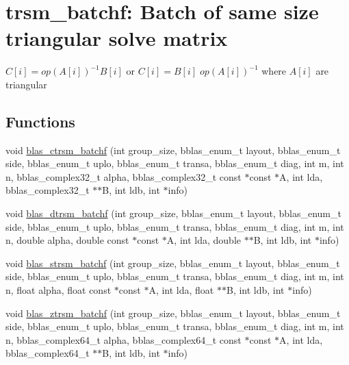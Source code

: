 \hypertarget{group__trsm__batchf}{}\section{trsm\+\_\+batchf\+: Batch of same size triangular solve matrix}
\label{group__trsm__batchf}


$ C[i] = op(A[i])^{-1} B[i] $ or $ C[i] = B[i] \;op(A[i])^{-1} $ where $ A[i] $ are triangular  


\subsection*{Functions}
\begin{DoxyCompactItemize}
\item 
void \hyperlink{group__trsm__batchf_ga8d26eef5fac78c6c866b81bfd73ec443}{blas\+\_\+ctrsm\+\_\+batchf} (int group\+\_\+size, bblas\+\_\+enum\+\_\+t layout, bblas\+\_\+enum\+\_\+t side, bblas\+\_\+enum\+\_\+t uplo, bblas\+\_\+enum\+\_\+t transa, bblas\+\_\+enum\+\_\+t diag, int m, int n, bblas\+\_\+complex32\+\_\+t alpha, bblas\+\_\+complex32\+\_\+t const $\ast$const $\ast$A, int lda, bblas\+\_\+complex32\+\_\+t $\ast$$\ast$B, int ldb, int $\ast$info)
\item 
void \hyperlink{group__trsm__batchf_gaaf04f4a1d924157736c9712a82b556bb}{blas\+\_\+dtrsm\+\_\+batchf} (int group\+\_\+size, bblas\+\_\+enum\+\_\+t layout, bblas\+\_\+enum\+\_\+t side, bblas\+\_\+enum\+\_\+t uplo, bblas\+\_\+enum\+\_\+t transa, bblas\+\_\+enum\+\_\+t diag, int m, int n, double alpha, double const $\ast$const $\ast$A, int lda, double $\ast$$\ast$B, int ldb, int $\ast$info)
\item 
void \hyperlink{group__trsm__batchf_ga3a305094ed72cc68fa60e4a749f56e1f}{blas\+\_\+strsm\+\_\+batchf} (int group\+\_\+size, bblas\+\_\+enum\+\_\+t layout, bblas\+\_\+enum\+\_\+t side, bblas\+\_\+enum\+\_\+t uplo, bblas\+\_\+enum\+\_\+t transa, bblas\+\_\+enum\+\_\+t diag, int m, int n, float alpha, float const $\ast$const $\ast$A, int lda, float $\ast$$\ast$B, int ldb, int $\ast$info)
\item 
void \hyperlink{group__trsm__batchf_ga262ec8615f2eaa0ab09966b69aba9a17}{blas\+\_\+ztrsm\+\_\+batchf} (int group\+\_\+size, bblas\+\_\+enum\+\_\+t layout, bblas\+\_\+enum\+\_\+t side, bblas\+\_\+enum\+\_\+t uplo, bblas\+\_\+enum\+\_\+t transa, bblas\+\_\+enum\+\_\+t diag, int m, int n, bblas\+\_\+complex64\+\_\+t alpha, bblas\+\_\+complex64\+\_\+t const $\ast$const $\ast$A, int lda, bblas\+\_\+complex64\+\_\+t $\ast$$\ast$B, int ldb, int $\ast$info)
\end{DoxyCompactItemize}


